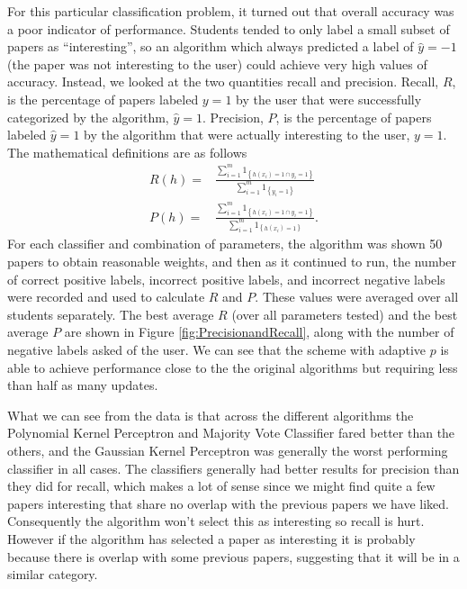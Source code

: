 \documentclass[12pt]{article}
\begin{document}
For this particular classification problem, it turned out that overall accuracy was a poor indicator of performance.  Students tended to only label a small subset of papers as ``interesting'', so an algorithm which always predicted a label of $\hat{y} = -1$ (the paper was not interesting to the user) could achieve very high values of accuracy.  Instead, we looked at the two quantities recall and precision.  Recall, $R$, is the percentage of papers labeled $y=1$ by the user that were successfully categorized by the algorithm, $\hat{y} = 1$.  Precision, $P$, is the percentage of papers labeled $\hat{y} = 1$ by the algorithm that were actually interesting to the user, $y = 1$.  The mathematical definitions are as follows 
\begin{align*}
R(h) = & \frac{\sum_{i=1}^m 1_{\left\{h(x_i) = 1 \cap y_i =1\right\}}}{\sum_{i=1}^m 1_{\left\{y_i = 1\right\}}} \\
P(h) = & \frac{\sum_{i=1}^m 1_{\left\{h(x_i) = 1 \cap y_i =1\right\}}}{\sum_{i=1}^m 1_{\left\{h(x_i) = 1\right\}}}.
\end{align*}
For each classifier and combination of parameters, the algorithm was shown 50 papers to obtain reasonable weights, and then as it continued to run, the number of correct positive labels, incorrect positive labels, and incorrect negative labels were recorded and used to calculate $R$ and $P$.  These values were averaged over all students separately. The best average $R$ (over all parameters tested) and the best average $P$ are shown in Figure \ref{fig:PrecisionandRecall}, along with the number of negative labels asked of the user.  We can see that the scheme with adaptive $p$ is able to achieve performance close to the the original algorithms but requiring less than half as many updates.

What we can see from the data is that across the different algorithms the Polynomial Kernel Perceptron and Majority Vote Classifier fared better than the others, and the Gaussian Kernel Perceptron was generally the worst performing classifier in all cases. The classifiers generally had better results for precision than they did for recall, which makes a lot of sense since we might find quite a few papers interesting that share no overlap with the previous papers we have liked. Consequently the algorithm won't select this as interesting so recall is hurt. However if the algorithm has selected a paper as interesting it is probably because there is overlap with some previous papers, suggesting that it will be in a similar category.
\end{document}

